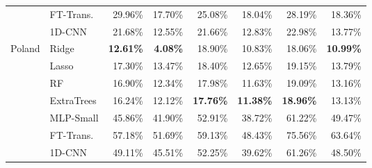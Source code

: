\documentclass[pdflatex,sn-mathphys-num, oneside, 11pt]{sn-jnl}%
\theoremstyle{thmstyleone}%
\theoremstyle{thmstyletwo}%
\theoremstyle{thmstylethree}%
\begin{document}
\begin{appendices}
\begin{table}[ht!]
\begin{tabular}{ll rr rr rr}
& FT-Trans.    & 29.96\% & 17.70\% & 25.08\% & 18.04\% & 28.19\% & 18.36\% \\
& 1D-CNN       & 21.68\% & 12.55\% & 21.66\% & 12.83\% & 22.98\% & 13.77\% \\
\midrule
\multirow{7}{*}{Poland}
& Ridge        & \textbf{12.61\%} & \textbf{4.08\%} & 18.90\% & 10.83\% & 18.06\% & \textbf{10.99\%} \\
& Lasso        & 17.30\% & 13.47\% & 18.40\% & 12.65\% & 19.15\% & 13.79\% \\
& RF           & 16.90\% & 12.34\% & 17.98\% & 11.63\% & 19.09\% & 13.16\% \\
& ExtraTrees   & 16.24\% & 12.12\% & \textbf{17.76\%} & \textbf{11.38\%} & \textbf{18.96\%} & 13.13\% \\
\cmidrule(lr){2-8}
& MLP-Small    & 45.86\% & 41.90\% & 52.91\% & 38.72\% & 61.22\% & 49.47\% \\
& FT-Trans.    & 57.18\% & 51.69\% & 59.13\% & 48.43\% & 75.56\% & 63.64\% \\
& 1D-CNN       & 49.11\% & 45.51\% & 52.25\% & 39.62\% & 61.26\% & 48.50\% \\
\bottomrule
\end{tabular}
\end{table}




\end{appendices}

\end{document}
